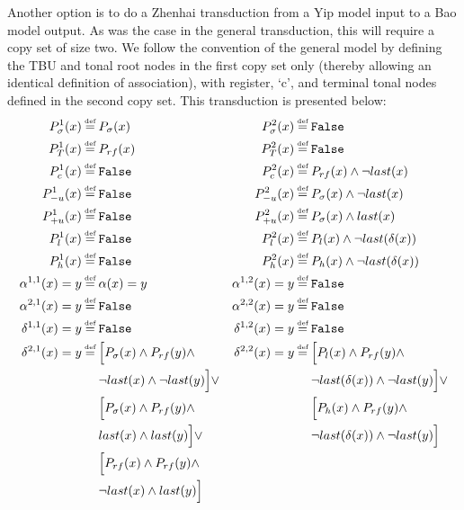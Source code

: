 \documentclass{article}
\newcommand\myeq{\mathrel{\stackrel{\makebox[0pt]{\mbox{\normalfont\tiny def}}}{=}}}
\begin{document}
Another option is to do a Zhenhai transduction from a Yip model input to a Bao model output. As was the case in the general transduction, this will require a copy set of size two. We follow the convention of the general model by defining the TBU and tonal root nodes in the first copy set only (thereby allowing an identical definition of association), with register, `c', and terminal tonal nodes defined in the second copy set. This transduction is presented below:
\begin{equation}
\begin{aligned}
P_{\sigma}^{1}(x)&\myeq P_{\sigma}(x) & P_{\sigma}^{2}(x)&\myeq\mathtt{False} \\
P_{T}^{1}(x)&\myeq P_{rf}(x) & P_{T}^{2}(x)&\myeq\mathtt{False} \\
P_{c}^{1}(x)&\myeq \mathtt{False} & P_{c}^{2}(x)&\myeq P_{rf}(x)\land \neg last(x) \\
P_{-u}^{1}(x)&\myeq \mathtt{False} & P_{-u}^{2}(x)&\myeq P_{\sigma}(x)\land \neg last(x) \\
P_{+u}^{1}(x)&\myeq \mathtt{False} & P_{+u}^{2}(x)&\myeq P_{\sigma}(x)\land  last(x) \\
P_{l}^{1}(x)&\myeq \mathtt{False} & P_{l}^{2}(x)&\myeq P_{l}(x)\land \neg last(\delta(x)) \\
P_{h}^{1}(x)&\myeq \mathtt{False} & P_{h}^{2}(x)&\myeq P_{h}(x)\land \neg last(\delta(x)) \\
\alpha^{1,1}(x)=y&\myeq \alpha(x)=y & \alpha^{1,2}(x)=y&\myeq\mathtt{False} \\
\alpha^{2,1}(x)=y&\myeq \mathtt{False} & \alpha^{2,2}(x)=y&\myeq\mathtt{False} \\
\delta^{1,1}(x)=y&\myeq \mathtt{False} & \delta^{1,2}(x)=y&\myeq \mathtt{False} \\
\delta^{2,1}(x)=y&\myeq \Big[ P_{\sigma}(x)\land P_{rf}(y)\land & \delta^{2,2}(x)=y&\myeq \Big[ P_{l}(x)\land P_{rf}(y) \land \\
&\quad \, \, \neg last(x)\land \neg last(y)\Big]\lor & &\quad \, \, \neg last(\delta(x))\land \neg last(y)\Big] \lor \\
&\quad \, \, \Big[ P_{\sigma}(x)\land P_{rf}(y)\land & &\quad \, \, \Big[ P_{h}(x)\land P_{rf}(y)\land \\
&\quad \, \, last(x)\land last(y)\Big] \lor & &\quad \, \, \neg last(\delta(x))\land \neg last(y)\Big] \\
&\quad \, \, \Big[ P_{rf}(x)\land P_{rf}(y) \land \\
&\quad \, \, \neg last(x) \land last(y)\Big]
\end{aligned}
\end{equation}
\end{document}
